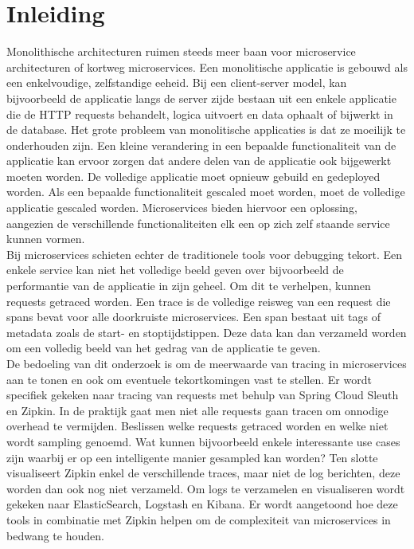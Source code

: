 
\chapter{Inleiding}
\label{ch:inleiding}

Monolithische architecturen ruimen steeds meer baan voor microservice architecturen of kortweg microservices. Een monolitische applicatie is gebouwd als een enkelvoudige, zelfstandige eeheid. Bij een client-server model, kan bijvoorbeeld de applicatie langs de server zijde bestaan uit een enkele applicatie die de HTTP requests behandelt, logica uitvoert en data ophaalt of bijwerkt in de database. Het grote probleem van monolitische applicaties is dat ze moeilijk te onderhouden zijn. Een kleine verandering in een bepaalde functionaliteit van de applicatie kan ervoor zorgen dat andere delen van de applicatie ook bijgewerkt moeten worden. De volledige applicatie moet opnieuw gebuild en gedeployed worden. Als een bepaalde functionaliteit gescaled moet worden, moet de volledige applicatie gescaled worden. Microservices bieden hiervoor een oplossing, aangezien de verschillende functionaliteiten elk een op zich zelf staande service kunnen vormen. \\

Bij microservices schieten echter de traditionele tools voor debugging tekort. Een enkele service kan niet het volledige beeld geven over bijvoorbeeld de performantie van de applicatie in zijn geheel. Om dit te verhelpen, kunnen requests getraced worden. Een trace is de volledige reisweg van een request die spans bevat voor alle doorkruiste microservices. Een span bestaat uit tags of metadata zoals de start- en stoptijdstippen. Deze data kan dan verzameld worden om een volledig beeld van het gedrag van de applicatie te geven. \\

De bedoeling van dit onderzoek is om de meerwaarde van tracing in microservices aan te tonen en ook om eventuele tekortkomingen vast te stellen. Er wordt specifiek gekeken naar tracing van requests met behulp van Spring Cloud Sleuth en Zipkin. In de praktijk gaat men niet alle requests gaan tracen om onnodige overhead te vermijden. Beslissen welke requests getraced worden en welke niet wordt sampling genoemd. Wat kunnen bijvoorbeeld enkele interessante use cases zijn waarbij er op een intelligente manier gesampled kan worden? Ten slotte visualiseert Zipkin enkel de verschillende traces, maar niet de log berichten, deze worden dan ook nog niet verzameld. Om logs te verzamelen en visualiseren wordt gekeken naar ElasticSearch, Logstash en Kibana. Er wordt aangetoond hoe deze tools in combinatie met Zipkin helpen om de complexiteit van microservices in bedwang te houden.  \\

